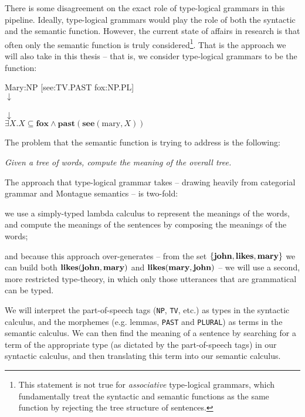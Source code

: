 \documentclass[a4paper]{article}
\begin{document}
There is some disagreement on the exact role of type-logical grammars in
this pipeline. Ideally, type-logical grammars would play the role of
both the syntactic and the semantic function. However, the current
state of affairs in research is that often only the semantic function
is truly considered\footnote{%
  This statement is not true for \emph{associative} type-logical
  grammars, which fundamentally treat the syntactic and semantic
  functions as the same function by rejecting the tree structure of
  sentences.
}. That is the approach we will also take in this thesis -- that is,
we consider type-logical grammars to be the function:
%
\begin{center}
  Mary:NP [see:TV.PAST fox:NP.PL]\\
  $\downarrow$\\
  \\
  $\downarrow$\\
  $\exists X.X\subseteq\mathbf{fox}\land\mathbf{past}(\mathbf{see}(\text{mary},X))$
\end{center}
%
The problem that the semantic function is trying to address is the
following:
%
\begin{center}\itshape
  Given a tree of words, compute the meaning of the overall tree.
\end{center}
%
The approach that type-logical grammar takes -- drawing heavily from
categorial grammar and Montague semantics -- is two-fold:
\begin{enumerate*}[label=(\arabic*)]
\item%
  we use a simply-typed lambda calculus to represent the meanings of the
  words, and compute the meanings of the sentences by composing the
  meanings of the words;
\item%
  and because this approach over-generates -- from the set
  $\{\mathbf{john},\mathbf{likes},\mathbf{mary}\}$ we can build both
  $\mathbf{likes}(\mathbf{john},\mathbf{mary})$ and
  $\mathbf{likes}(\mathbf{mary},\mathbf{john})$ -- we will use a second,
  more restricted type-theory, in which only those utterances that are
  grammatical can be typed.
\end{enumerate*}
We will interpret the part-of-speech tags (\texttt{NP}, \texttt{TV},
etc.) as types in the syntactic calculus, and the morphemes
(e.g. lemmas, \texttt{PAST} and \texttt{PLURAL}) as terms in the
semantic calculus. We can then find the meaning of a sentence by
searching for a term of the appropriate type (as dictated by the
part-of-speech tags) in our syntactic calculus, and then translating
this term into our semantic calculus.
\end{document}
